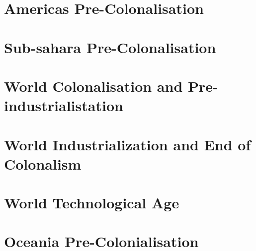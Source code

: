 \documentclass{article}
\begin{document}
\section{Americas Pre-Colonalisation}

\section{Sub-sahara Pre-Colonalisation}

\section{World Colonalisation and Pre-industrialistation}

\section{World Industrialization and End of Colonalism}

\section{World Technological Age}

\section{Oceania Pre-Colonialisation}
\end{document}
